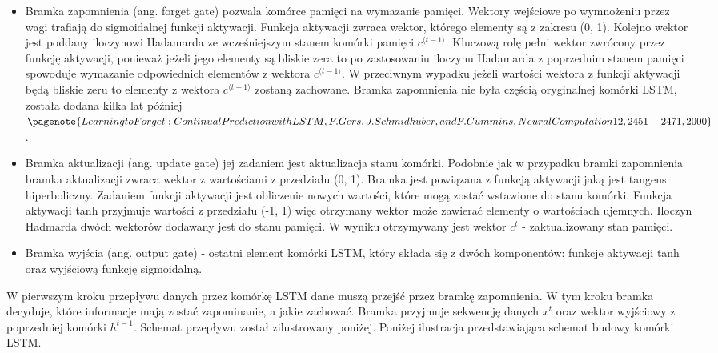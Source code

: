 	\begin{itemize}
		\item Bramka zapomnienia (ang. forget gate) pozwala komórce pamięci na wymazanie pamięci. Wektory wejściowe po wymnożeniu przez wagi trafiają do sigmoidalnej funkcji aktywacji. Funkcja aktywacji zwraca wektor, którego elementy są z zakresu (0, 1). Kolejno wektor jest poddany iloczynowi Hadamarda ze wcześniejszym stanem komórki pamięci  $c^{\langle t-1 \rangle}$. Kluczową rolę pełni wektor zwrócony przez funkcję aktywacji, ponieważ jeżeli jego elementy są bliskie zera to po zastosowaniu iloczynu Hadamarda z poprzednim stanem pamięci spowoduje wymazanie odpowiednich elementów z wektora $c^{\langle t-1 \rangle}$. W przeciwnym wypadku jeżeli wartości wektora z funkcji aktywacji będą bliskie zeru to elementy z wektora $c^{\langle t-1 \rangle}$ zostaną zachowane. Bramka zapomnienia nie była częścią oryginalnej komórki LSTM, została dodana kilka lat później$\pagenote{Learning to Forget: Continual
			Prediction with LSTM, F. Gers, J. Schmidhuber, and F. Cummins, Neural
			Computation 12, 2451-2471, 2000}$.
		
		\item Bramka aktualizacji (ang. update gate) jej zadaniem jest aktualizacja stanu komórki. Podobnie jak w przypadku bramki zapomnienia bramka aktualizacji zwraca wektor z wartościami z przedziału (0, 1). Bramka jest powiązana z funkcją aktywacji jaką jest tangens hiperboliczny. Zadaniem funkcji aktywacji jest obliczenie nowych wartości, które mogą zostać wstawione do stanu komórki. Funkcja aktywacji tanh przyjmuje wartości z przedziału (-1, 1) więc otrzymany wektor może zawierać elementy o wartościach ujemnych. Iloczyn Hadmarda dwóch wektorów dodawany jest do stanu pamięci. W wyniku otrzymywany jest wektor $c^{t}$ - zaktualizowany stan pamięci.
		
		\item Bramka wyjścia (ang. output gate) - ostatni element komórki LSTM, który składa się z dwóch komponentów: funkcje aktywacji tanh oraz wyjściową funkcję sigmoidalną. 
		
	\end{itemize}
	
	W pierwszym kroku przepływu danych przez komórkę LSTM dane muszą przejść przez bramkę zapomnienia. W tym kroku bramka decyduje, które informacje mają zostać zapominanie, a jakie zachować. Bramka przyjmuje sekwencję danych $x^{t}$ oraz wektor wyjściowy z poprzedniej komórki $h^{t-1}$. Schemat przepływu został zilustrowany poniżej. Poniżej ilustracja przedstawiająca schemat budowy komórki LSTM.
	
